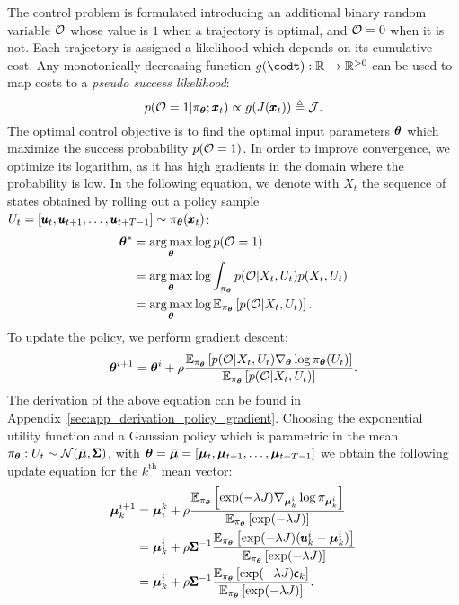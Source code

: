 The control problem is formulated introducing an additional binary random variable $\mathcal{O}$ whose value is $1$ when a trajectory is optimal, and $\mathcal{O} = 0$ when it is not. Each trajectory is assigned a likelihood which depends on its cumulative cost. Any monotonically decreasing function $g(\codt): \nR{} \rightarrow \nR{>0}$ can be used to map costs to a \textit{pseudo success likelihood}:
\begin{equation}
p(\mathcal{O} = 1| \pi_{\boldsymbol{\theta}}; \pmb{x}_t ) \propto g(J(\pmb{x}_t)) \triangleq \mathcal{J}.
\end{equation}
The optimal control objective is to find the optimal input parameters $\boldsymbol{\theta}$ which maximize the success probability $p(\mathcal{O} = 1)$. In order to improve convergence, we optimize its logarithm, as it has high gradients in the domain where the probability is low. In the following equation, we denote with $X_t$ the sequence of states obtained by rolling out a policy sample $U_t = [\pmb{u}_t, \pmb{u}_{t+1}, \dots, \pmb{u}_{t+T-1}] \sim \pi_{\boldsymbol{\theta}}(\pmb{x}_t)$: 
\begin{align}
    \boldsymbol{\theta}^* &= \underset{\boldsymbol{\theta}}{\arg\max} \log p(\mathcal{O} = 1) \\
        &= \underset{\boldsymbol{\theta}}{\arg\max} \log \int_{\pi_{\boldsymbol{\theta}}} p(\mathcal{O} | X_t, U_t) p(X_t, U_t) \\
        &= \underset{\boldsymbol{\theta}}{\arg\max}  \log \mathbb{E}_{\pi_{\boldsymbol{\theta}}} \left [p(\mathcal{O} | X_t, U_t)\right]. \label{eq:input_to_params}
\end{align}
To update the policy, we perform gradient descent:
\begin{equation}
    \boldsymbol{\theta}^{i+1} = \boldsymbol{\theta}^i + \rho \frac{\mathbb{E}_{\pi_{\boldsymbol{\theta}}} \left [p(\mathcal{O} | X_t, U_t) \nabla_{ \boldsymbol{\theta}} \log \pi_{\boldsymbol{\theta}} (U_t)\right]}{\mathbb{E}_{\pi_{\boldsymbol{\theta}}} \left [p(\mathcal{O} | X_t, U_t)\right]}.
\end{equation}
The derivation of the above equation can be found in Appendix~\ref{sec:app_derivation_policy_gradient}. 
Choosing the exponential utility function and a Gaussian policy which is parametric in the mean $\pi_{\boldsymbol{\theta}}: U_t \sim \mathcal{N}(\bar{\boldsymbol{\mu}}, \pmb{\Sigma})$, with $\boldsymbol{\theta} = \bar{\boldsymbol{\mu}} = [\boldsymbol{\mu}_t, \boldsymbol{\mu}_{t+1}, \dots, \boldsymbol{\mu}_{t+T-1}]$ we obtain the following update equation for the $k^{\text{th}}$ mean vector:
\begin{align}
    \boldsymbol{\mu}^{i+1}_{k} &=  \boldsymbol{\mu}^{k}_{i} + \rho \frac{\mathbb{E}_{\pi_{\boldsymbol{\theta}}} \left [ \exp( -\lambda J) \nabla_{\boldsymbol{\mu}_{k}^{i}} \log \pi_{\boldsymbol{\mu}^{i}_{k}}\right]}{\mathbb{E}_{\pi_{\boldsymbol{\theta}}} \left [\exp( -\lambda J)\right]} \\
    &= \boldsymbol{\mu}^{i}_{k} +  \rho \pmb{\Sigma}^{-1}\frac{\mathbb{E}_{\pi_{\boldsymbol{\theta}}} \left [\exp( -\lambda J) (\pmb{u}_{k}^{i} - \boldsymbol{\mu}^{i}_{k} )\right]}{\mathbb{E}_{\pi_{\boldsymbol{\theta}}} \left [\exp( -\lambda J)\right]}  \label{eq:bayes_to_mppi} \\
    &= \boldsymbol{\mu}^{i}_{k} +  \rho \pmb{\Sigma}^{-1} \frac{\mathbb{E}_{\pi_{\boldsymbol{\theta}}} \left [\exp( -\lambda J) \pmb{\epsilon}_k \right]}{\mathbb{E}_{\pi_{\boldsymbol{\theta}}} \left [\exp( -\lambda J)\right]}  \label{eq:alpha_assumption}.
\end{align}
